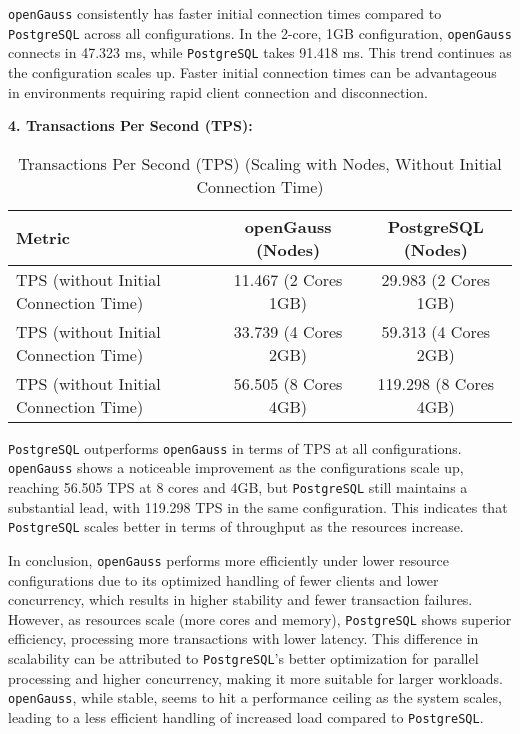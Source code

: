 \documentclass[12pt,a4paper,cs4size]{ctexart}
\begin{document}
\texttt{openGauss} consistently has faster initial connection times compared to \texttt{PostgreSQL} across all configurations. In the 2-core, 1GB configuration, \texttt{openGauss} connects in 47.323 ms, while \texttt{PostgreSQL} takes 91.418 ms. This trend continues as the configuration scales up. Faster initial connection times can be advantageous in environments requiring rapid client connection and disconnection.

\textbf{4. Transactions Per Second (TPS):}

\begin{table}[h!]
\centering
\captionsetup{labelformat=empty}
\begin{tabular}{|l|c|c|}
\hline
\textbf{Metric} & \textbf{openGauss (Nodes)} & \textbf{PostgreSQL (Nodes)} \\
\hline
TPS (without Initial Connection Time) & 11.467 (2 Cores 1GB) & 29.983 (2 Cores 1GB) \\
\hline
TPS (without Initial Connection Time) & 33.739 (4 Cores 2GB) & 59.313 (4 Cores 2GB) \\
\hline
TPS (without Initial Connection Time) & 56.505 (8 Cores 4GB) & 119.298 (8 Cores 4GB) \\
\hline
\end{tabular}
\caption{Transactions Per Second (TPS) (Scaling with Nodes, Without Initial Connection Time)}
\end{table}

\texttt{PostgreSQL} outperforms \texttt{openGauss} in terms of TPS at all configurations. \texttt{openGauss} shows a noticeable improvement as the configurations scale up, reaching 56.505 TPS at 8 cores and 4GB, but \texttt{PostgreSQL} still maintains a substantial lead, with 119.298 TPS in the same configuration. This indicates that \texttt{PostgreSQL} scales better in terms of throughput as the resources increase.

In conclusion, \texttt{openGauss} performs more efficiently under lower resource configurations due to its optimized handling of fewer clients and lower concurrency, which results in higher stability and fewer transaction failures. However, as resources scale (more cores and memory), \texttt{PostgreSQL} shows superior efficiency, processing more transactions with lower latency. This difference in scalability can be attributed to \texttt{PostgreSQL}'s better optimization for parallel processing and higher concurrency, making it more suitable for larger workloads. \texttt{openGauss}, while stable, seems to hit a performance ceiling as the system scales, leading to a less efficient handling of increased load compared to \texttt{PostgreSQL}.
\end{document}
